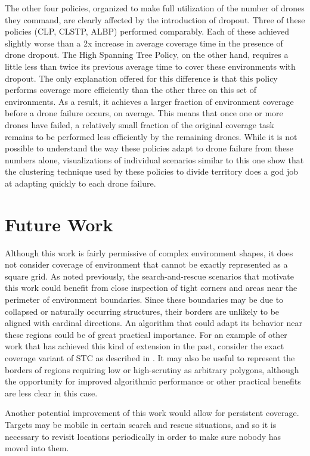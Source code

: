 The other four policies, organized to make full utilization of the number of drones they command, are clearly affected by the introduction of dropout. Three of these policies (CLP, CLSTP, ALBP) performed comparably. Each of these achieved slightly worse than a 2x increase in average coverage time in the presence of drone dropout. The High Spanning Tree Policy, on the other hand, requires a little less than twice its previous average time to cover these environments with dropout. The only explanation offered for this difference is that this policy performs coverage more efficiently than the other three on this set of environments. As a result, it achieves a larger fraction of environment coverage before a drone failure occurs, on average. This means that once one or more drones have failed, a relatively small fraction of the original coverage task remains to be performed less efficiently by the remaining drones. While it is not possible to understand the way these policies adapt to drone failure from these numbers alone, visualizations of individual scenarios similar to this one show that the clustering technique used by these policies to divide territory does a god job at adapting quickly to each drone failure.

\section{Future Work}

Although this work is fairly permissive of complex environment shapes, it does not consider coverage of environment that cannot be exactly represented as a square grid. As noted previously, the search-and-rescue scenarios that motivate this work could benefit from close inspection of tight corners and areas near the perimeter of environment boundaries. Since these boundaries may be due to collapsed or naturally occurring structures, their borders are unlikely to be aligned with cardinal directions. An algorithm that could adapt its behavior near these regions could be of great practical importance. For an example of other work that has achieved this kind of extension in the past, consider the exact coverage variant of STC as described in \cite{STC}. It may also be useful to represent the borders of regions requiring low or high-scrutiny as arbitrary polygons, although the opportunity for improved algorithmic performance or other practical benefits are less clear in this case.

Another potential improvement of this work would allow for persistent coverage. Targets may be mobile in certain search and rescue situations, and so it is necessary to revisit locations periodically in order to make sure nobody has moved into them. %

